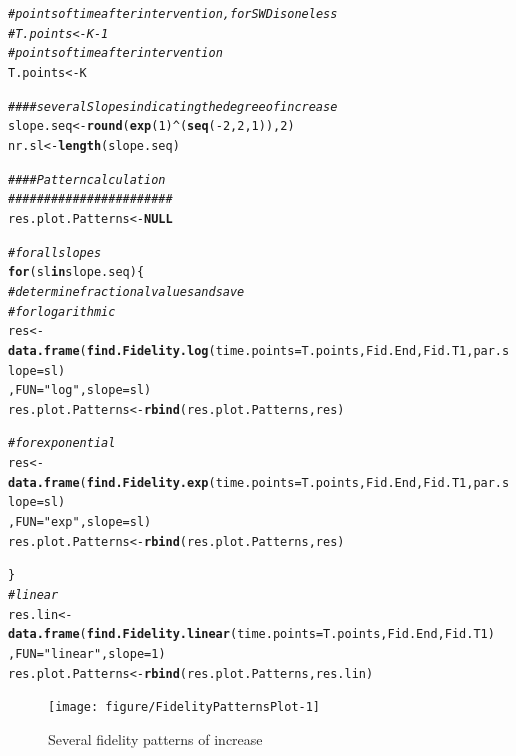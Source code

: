 \documentclass{article}\usepackage[]{graphicx}\usepackage[]{color}
\makeatletter
\newcommand{\hlnum}[1]{\textcolor[rgb]{0.686,0.059,0.569}{#1}}%
\newcommand{\hlstr}[1]{\textcolor[rgb]{0.192,0.494,0.8}{#1}}%
\newcommand{\hlcom}[1]{\textcolor[rgb]{0.678,0.584,0.686}{\textit{#1}}}%
\newcommand{\hlopt}[1]{\textcolor[rgb]{0,0,0}{#1}}%
\newcommand{\hlstd}[1]{\textcolor[rgb]{0.345,0.345,0.345}{#1}}%
\newcommand{\hlkwa}[1]{\textcolor[rgb]{0.161,0.373,0.58}{\textbf{#1}}}%
\newcommand{\hlkwb}[1]{\textcolor[rgb]{0.69,0.353,0.396}{#1}}%
\newcommand{\hlkwc}[1]{\textcolor[rgb]{0.333,0.667,0.333}{#1}}%
\newcommand{\hlkwd}[1]{\textcolor[rgb]{0.737,0.353,0.396}{\textbf{#1}}}%
\newenvironment{kframe}{%
 \def\at@end@of@kframe{}%
 \ifinner\ifhmode%
  \def\at@end@of@kframe{\end{minipage}}%
  \begin{minipage}{\columnwidth}%
 \fi\fi%
 \def\FrameCommand##1{\hskip\@totalleftmargin \hskip-\fboxsep
 \colorbox{shadecolor}{##1}\hskip-\fboxsep
     \hskip-\linewidth \hskip-\@totalleftmargin \hskip\columnwidth}%
 \MakeFramed {\advance\hsize-\width
   \@totalleftmargin\z@ \linewidth\hsize
   \@setminipage}}%
 {\par\unskip\endMakeFramed%
 \at@end@of@kframe}
\newenvironment{knitrout}{}{} %
\makeatother
\begin{document}
\begin{knitrout}
\color{fgcolor}\begin{kframe}
\begin{alltt}
\hlcom{#points of time after intervention, for SWD is one less}
\hlcom{#T.points<-K-1}
\hlcom{#points of time after intervention}
\hlstd{T.points}\hlkwb{<-}\hlstd{K}

\hlcom{####several Slopes indicating the degree of increase}
\hlstd{slope.seq}\hlkwb{<-}\hlkwd{round}\hlstd{(}\hlkwd{exp}\hlstd{(}\hlnum{1}\hlstd{)}\hlopt{^}\hlstd{(}\hlkwd{seq}\hlstd{(}\hlopt{-}\hlnum{2}\hlstd{,}\hlnum{2}\hlstd{,}\hlnum{1}\hlstd{)),}\hlnum{2}\hlstd{)}
\hlstd{nr.sl}\hlkwb{<-}\hlkwd{length}\hlstd{(slope.seq)}

\hlcom{####Pattern calculation}
\hlcom{#######################}
\hlstd{res.plot.Patterns}\hlkwb{<-}\hlkwa{NULL}

\hlcom{#for all slopes}
\hlkwa{for}\hlstd{(sl} \hlkwa{in} \hlstd{slope.seq)\{}
      \hlcom{#determine fractional values and save}
      \hlcom{#for logarithmic}
      \hlstd{res}\hlkwb{<-}\hlkwd{data.frame}\hlstd{(}\hlkwd{find.Fidelity.log}\hlstd{(}\hlkwc{time.points}\hlstd{=T.points, Fid.End, Fid.T1,} \hlkwc{par.slope}\hlstd{=sl)}
                      \hlstd{,} \hlkwc{FUN}\hlstd{=}\hlstr{"log"}\hlstd{,} \hlkwc{slope}\hlstd{=sl)}
      \hlstd{res.plot.Patterns}\hlkwb{<-}\hlkwd{rbind}\hlstd{(res.plot.Patterns, res)}

      \hlcom{#for exponential}
      \hlstd{res}\hlkwb{<-}\hlkwd{data.frame}\hlstd{(}\hlkwd{find.Fidelity.exp}\hlstd{(}\hlkwc{time.points}\hlstd{=T.points, Fid.End, Fid.T1,} \hlkwc{par.slope}\hlstd{=sl)}
                      \hlstd{,} \hlkwc{FUN}\hlstd{=}\hlstr{"exp"}\hlstd{,} \hlkwc{slope}\hlstd{=sl)}
      \hlstd{res.plot.Patterns}\hlkwb{<-}\hlkwd{rbind}\hlstd{(res.plot.Patterns, res)}

\hlstd{\}}
\hlcom{#linear}
\hlstd{res.lin}\hlkwb{<-}\hlkwd{data.frame}\hlstd{(}\hlkwd{find.Fidelity.linear}\hlstd{(}\hlkwc{time.points}\hlstd{=T.points, Fid.End, Fid.T1)}
                     \hlstd{,} \hlkwc{FUN}\hlstd{=}\hlstr{"linear"}\hlstd{,} \hlkwc{slope}\hlstd{=}\hlnum{1}\hlstd{)}
\hlstd{res.plot.Patterns}\hlkwb{<-}\hlkwd{rbind}\hlstd{(res.plot.Patterns, res.lin)}
\end{alltt}
\end{kframe}
\end{knitrout}


\begin{knitrout}
\color{fgcolor}\begin{figure}
\texttt{[image: figure/FidelityPatternsPlot-1]} \caption[Several fidelity patterns of increase]{Several fidelity patterns of increase}\label{fig:FidelityPatternsPlot}
\end{figure}


\end{knitrout}
\end{document}

